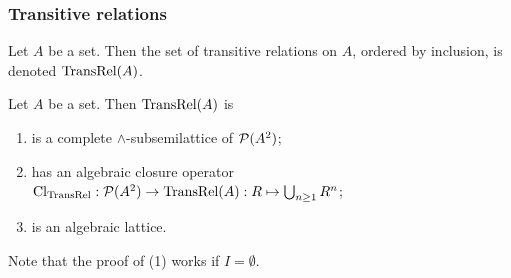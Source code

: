 \subsubsection{Transitive relations}
\begin{definition}
Let $A$ be a set. Then the set of transitive relations on $A$, ordered by inclusion, is denoted $\operatorname{TransRel}(A)$.
\end{definition}

\begin{proposition}
Let $A$ be a set. Then $\operatorname{TransRel}(A)$ is
\begin{enumerate}
\item is a complete $\wedge$-subsemilattice of $\operatorname{\mathcal{P}}(A^2)$;
\item has an algebraic closure operator $\operatorname{Cl}_{\operatorname{TransRel}}: \operatorname{\mathcal{P}}(A^2)\to \operatorname{TransRel}(A): R\mapsto \bigcup_{n\geq 1}R^n$;
\item is an algebraic lattice.
\end{enumerate}
\end{proposition}
Note that the proof of (1) works if $I=\emptyset$. 
